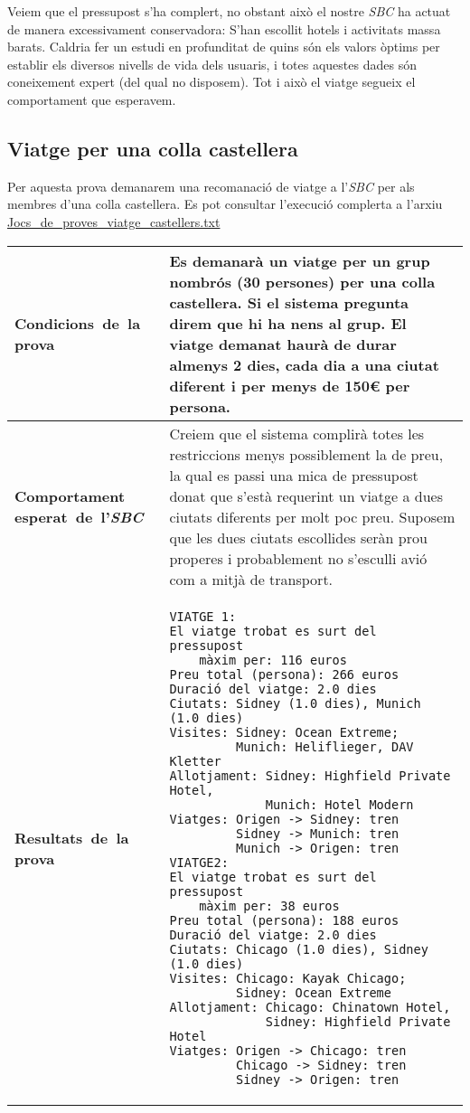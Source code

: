 \documentclass[11pt,a4paper]{article}
\begin{document}
Veiem que el pressupost s'ha complert, no obstant això el nostre \emph{SBC} ha actuat de manera excessivament conservadora: S'han escollit hotels i activitats massa barats. Caldria fer un estudi en profunditat de quins són els valors òptims per establir els diversos nivells de vida dels usuaris, i totes aquestes dades són coneixement expert (del qual no disposem). Tot i això el viatge segueix el comportament que esperavem.

\subsection{Viatge per una colla castellera}
Per aquesta prova demanarem una recomanació de viatge a l'\emph{SBC} per als membres d'una colla castellera. Es pot consultar l'execució complerta a l'arxiu \url{Jocs_de_proves_viatge_castellers.txt} \\

\noindent
\begin{tabular}{|p{}|p{}|}
\hline
\textbf{\mbox{Condicions de la} \mbox{prova}} & Es demanarà un viatge per un grup nombrós (30 persones) per una colla castellera. Si el sistema pregunta direm que hi ha nens al grup. El viatge demanat haurà de durar almenys 2 dies, cada dia a una ciutat diferent i per menys de 150\euro{} per persona.\\
\hline
\textbf{Comportament \mbox{esperat de l'\emph{SBC}}} & Creiem que el sistema complirà totes les restriccions menys possiblement la de preu, la qual es passi una mica de pressupost donat que s'està requerint un viatge a dues ciutats diferents per molt poc preu. Suposem que les dues ciutats escollides seràn prou properes i probablement no s'esculli avió com a mitjà de transport. \\
\hline
\textbf{\mbox{Resultats de la} \mbox{prova}} & \begin{verbatim}
VIATGE 1:
El viatge trobat es surt del pressupost
    màxim per: 116 euros 
Preu total (persona): 266 euros 
Duració del viatge: 2.0 dies 
Ciutats: Sidney (1.0 dies), Munich (1.0 dies) 
Visites: Sidney: Ocean Extreme;
         Munich: Heliflieger, DAV Kletter 
Allotjament: Sidney: Highfield Private Hotel,
             Munich: Hotel Modern 
Viatges: Origen -> Sidney: tren
         Sidney -> Munich: tren
         Munich -> Origen: tren 
VIATGE2:
El viatge trobat es surt del pressupost
    màxim per: 38 euros 
Preu total (persona): 188 euros 
Duració del viatge: 2.0 dies 
Ciutats: Chicago (1.0 dies), Sidney (1.0 dies) 
Visites: Chicago: Kayak Chicago; 
         Sidney: Ocean Extreme 
Allotjament: Chicago: Chinatown Hotel, 
             Sidney: Highfield Private Hotel 
Viatges: Origen -> Chicago: tren
         Chicago -> Sidney: tren
         Sidney -> Origen: tren
\end{verbatim} \\
\hline
\end{tabular} 
\medskip
\end{document}

